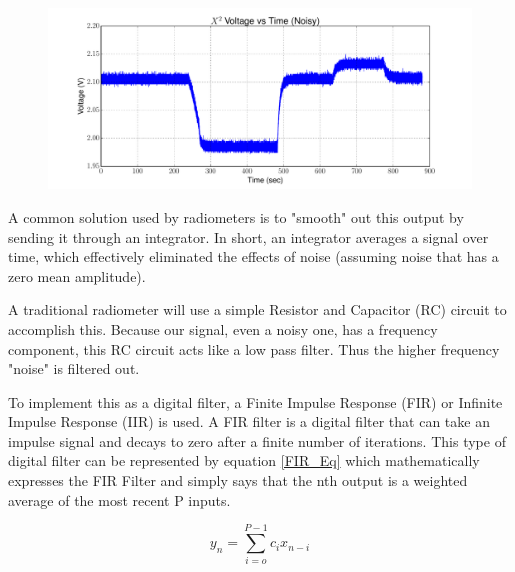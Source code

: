 {\begin{figure}[h!tb] 
\centering
\includegraphics[width=17cm]{Experiments/Exp1/noisy_voltage.pdf}
\label{square_raw}
\end{figure}
}

A common solution used by radiometers is to "smooth" out this output by sending it through an integrator.  In short, an integrator averages a signal over time, which effectively eliminated the effects of noise (assuming noise that has a zero mean amplitude).  

A traditional radiometer will use a simple Resistor and Capacitor (RC) circuit to accomplish this.  Because our signal, even a noisy one, has a frequency component, this RC circuit acts like a low pass filter.  Thus the higher frequency "noise" is filtered out.


To implement this as a digital filter, a Finite Impulse Response (FIR) or Infinite Impulse Response (IIR) is used.  A FIR filter is a digital filter that can take an impulse signal and decays to zero after a finite number of iterations.  This type of digital filter can be represented by equation \ref{FIR_Eq} which mathematically expresses the FIR Filter and simply says that the nth output is a weighted average of the most recent P inputs. 

\begin{equation}\label{FIR_Eq}
y_n=\displaystyle\sum\limits_{i=o}^{P-1} c_ix_{n-i}
\end{equation} 

